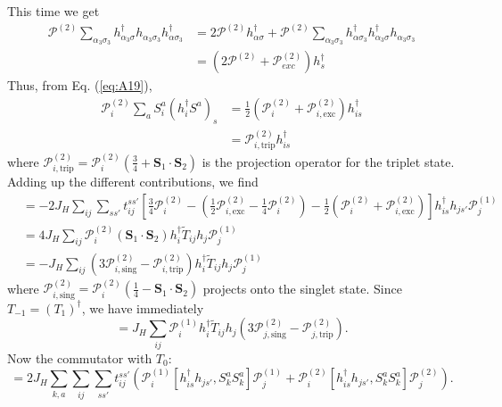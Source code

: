 \documentclass[11pt, a4paper]{article}
\begin{document}
This time we get
\begin{align}
\mathcal{P}^{(2)} \sum_{\alpha_3 \sigma_3} h_{\alpha_3 \sigma}^{\dagger} h_{\alpha_3 \sigma_3} h_{\alpha \sigma_3}^{\dagger} &= 2\mathcal{P}^{(2)} h_{\alpha \sigma}^{\dagger} + \mathcal{P}^{(2)} \sum_{\alpha_3 \sigma_3} h_{\alpha \sigma_3}^{\dagger} h_{\alpha_3 \sigma}^{\dagger} h_{\alpha_3 \sigma_3} \nonumber \\
&= (2\mathcal{P}^{(2)} + \mathcal{P}_{exc}^{(2)}) h_s^{\dagger} \label{eq:A20}
\end{align}
Thus, from Eq. (\ref{eq:A19}),
\begin{align}
\mathcal{P}_i^{(2)} \sum_a S_i^a (h_i^{\dagger} S^a)_s &= \frac{1}{2} (\mathcal{P}_i^{(2)} + \mathcal{P}_{i, \text{exc}}^{(2)}) h_{is}^{\dagger} \nonumber \\
&= \mathcal{P}_{i, \text{trip}}^{(2)} h_{is}^{\dagger} \label{eq:A21}
\end{align}
where $\mathcal{P}_{i, \text{trip}}^{(2)} = \mathcal{P}_i^{(2)} (\frac{3}{4} + \bm{S}_1 \cdot \bm{S}_2)$ is the projection operator for the triplet state. Adding up the different contributions, we find
\begin{align}
[V_S, T_1] &= -2J_H \sum_{ij} \sum_{ss'} t_{ij}^{ss'} \left[ \frac{3}{4}\mathcal{P}_i^{(2)} - \left(\frac{1}{2}\mathcal{P}_{i, \text{exc}}^{(2)} - \frac{1}{4}\mathcal{P}_i^{(2)}\right) - \frac{1}{2}(\mathcal{P}_i^{(2)} + \mathcal{P}_{i, \text{exc}}^{(2)}) \right] h_{is}^{\dagger} h_{js'} \mathcal{P}_j^{(1)} \nonumber \\
&= 4J_H \sum_{ij} \mathcal{P}_i^{(2)} (\bm{S}_1 \cdot \bm{S}_2) h_i^{\dagger} \tilde{T}_{ij} h_j \mathcal{P}_j^{(1)} \nonumber \\
&= -J_H \sum_{ij} (3\mathcal{P}_{i, \text{sing}}^{(2)} - \mathcal{P}_{i, \text{trip}}^{(2)}) h_i^{\dagger} \tilde{T}_{ij} h_j \mathcal{P}_j^{(1)} \label{eq:A23}
\end{align}
where $\mathcal{P}_{i, \text{sing}}^{(2)} = \mathcal{P}_i^{(2)} (\frac{1}{4} - \bm{S}_1 \cdot \bm{S}_2)$ projects onto the singlet state. Since $T_{-1} = (T_1)^{\dagger}$, we have immediately
\begin{equation}
[V_S, T_{-1}] = J_H \sum_{ij} \mathcal{P}_i^{(1)} h_i^{\dagger} \tilde{T}_{ij} h_j (3\mathcal{P}_{j, \text{sing}}^{(2)} - \mathcal{P}_{j, \text{trip}}^{(2)}). \label{eq:A25}
\end{equation}
Now the commutator with $T_0$:
\begin{equation}
[T_0, V_S] = 2J_H \sum_{k, a} \sum_{ij} \sum_{ss'} t_{ij}^{ss'} \left( \mathcal{P}_i^{(1)} [h_{is}^{\dagger} h_{js'}, S_k^a S_k^a] \mathcal{P}_j^{(1)} + \mathcal{P}_i^{(2)} [h_{is}^{\dagger} h_{js'}, S_k^a S_k^a] \mathcal{P}_j^{(2)} \right). \label{eq:A26}
\end{equation}
\end{document}
